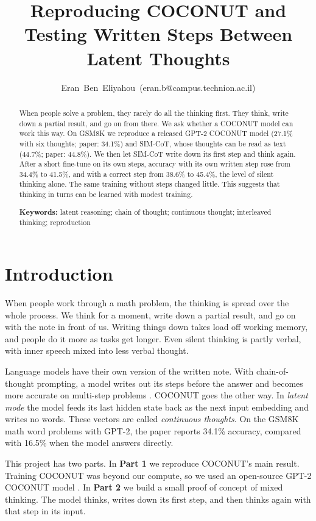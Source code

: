 \documentclass[10pt,letterpaper]{article}
\title{Reproducing COCONUT and Testing Written Steps Between Latent Thoughts}
\author[1]{\mbox{Eran Ben Eliyahou (eran.b@campus.technion.ac.il)}}
\affil[1]{Technion -- Israel Institute of Technology}
\begin{document}
\maketitle

\begin{abstract}
When people solve a problem, they rarely do all the thinking first. They think, write down a partial result, and go
on from there. We ask whether a COCONUT model can work this way. On GSM8K we reproduce a released
GPT-2 COCONUT model (27.1\% with six thoughts; paper: 34.1\%) and SIM-CoT, whose thoughts can be read as text
(44.7\%; paper: 44.8\%). We then let SIM-CoT write down its first step and think again. After a short fine-tune on its
own steps, accuracy with its own written step rose from 34.4\% to 41.5\%, and with a correct step from 38.6\% to
45.4\%, the level of silent thinking alone. The same training without steps changed little. This suggests that
thinking in turns can be learned with modest training.

\textbf{Keywords:}
latent reasoning; chain of thought; continuous thought; interleaved thinking; reproduction
\end{abstract}

\section{Introduction}

When people work through a math problem, the thinking is spread over the whole process. We think for a moment, write down a partial result, and go on with the note in front of us. Writing things down takes load off working memory, and people do it more as tasks get longer. Even silent thinking is partly verbal, with
inner speech mixed into less verbal thought.

Language models have their own version of the written note. With chain-of-thought prompting, a model writes out its
steps before the answer and becomes more accurate on multi-step problems \citep{wei2022chain}. COCONUT
\citep{hao2024training} goes the other way. In \emph{latent mode} the model feeds its last hidden state back as the
next input embedding and writes no words. These vectors are called \emph{continuous thoughts}. On the GSM8K math word
problems \citep{cobbe2021training} with GPT-2, the paper reports 34.1\% accuracy, compared with 16.5\% when the model answers directly.

This project has two parts. In
\textbf{Part 1} we reproduce COCONUT's main result. Training COCONUT was beyond our compute, so we used an open-source GPT-2 COCONUT model \citep{tsrigoCoconut}. In \textbf{Part 2} we build a small proof of concept of
mixed thinking. The model thinks, writes down its first step, and then thinks again with that step in its input.
\end{document}
